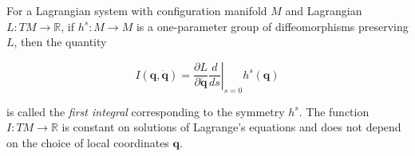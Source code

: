 For a Lagrangian system with configuration manifold $M$ and Lagrangian $L : TM \to \mathbb{R}$, if $h^s : M \to M$ is a one-parameter group of diffeomorphisms preserving $L$, then the quantity

$$I(\mathbf{q}, \dot{\mathbf{q}}) = \frac{\partial L}{\partial \dot{\mathbf{q}}} \left. \frac{d}{ds} \right|_{s=0} h^s(\mathbf{q})$$

is called the \textit{first integral} corresponding to the symmetry $h^s$. The function $I : TM \to \mathbb{R}$ is constant on solutions of Lagrange's equations and does not depend on the choice of local coordinates $\mathbf{q}$.
